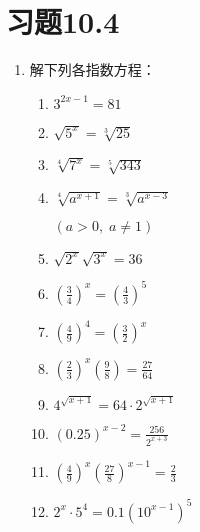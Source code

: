 \begin{example}
    
\end{example}

\begin{solution}
    
\end{solution}




\section*{习题10.4}
\begin{enumerate}
  \item 解下列各指数方程：
\begin{multicols}{2}
\begin{enumerate}
\item $3^{2 x-1}=81$
\item $\sqrt{5^{x}}=\sqrt[3]{25}$
\item  $\sqrt[4]{7^{x}}=\sqrt[5]{343}$
\item $\sqrt[4]{a^{x+1}}=\sqrt[3]{a^{x-3}}$

$(a>0,\;  a \neq 1)$
\item  $\sqrt{2^{x}} \sqrt{3^{x}}=36$
\item $\left(\frac{3}{4}\right)^x=\left(\frac{4}{3}\right)^5$
  \item $\left(\frac{4}{9}\right)^{4}=\left(\frac{3}{2}\right)^{x}$
  \item $\left(\frac{2}{3}\right)^{x}\left(\frac{9}{8}\right)=\frac{27}{64}$
  \item $ 4^{\sqrt{x+1}}=64 \cdot 2^{\sqrt{x+1}} $
  \item $(0.25)^{x-2}=\frac{256}{2^{x+3}}$
  \item  $\left(\frac{4}{9}\right)^{x}\left(\frac{27}{8}\right)^{x-1}=\frac{2}{3}$
  \item  $2^{x} \cdot 5^{4}=0.1\left(10^{x-1}\right)^{5}$
\end{enumerate}
\end{multicols}



\end{enumerate}
